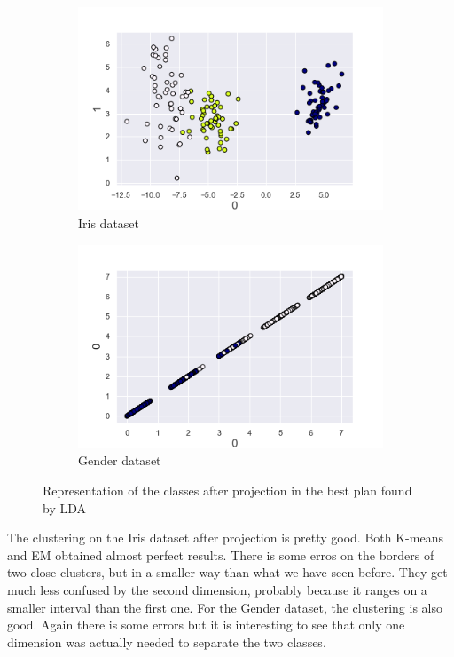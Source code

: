 \documentclass[twocolumn, 10pt]{article}
\begin{document}
			\begin{figure}[h]
				\centering
				\begin{subfigure}[t]{0.49\columnwidth}
					\centering
					\includegraphics[width=\linewidth]{../graphics/lda_iris_0_1_label.png}
					\caption{Iris dataset}
					\label{fig:lda_iris}
				\end{subfigure}
				\begin{subfigure}[t]{0.49\columnwidth}
					\centering
					\includegraphics[width=\linewidth]{../graphics/lda_g_0_0_label.png}
					\caption{Gender dataset}
					\label{fig:lda_g}
				\end{subfigure}
				\caption{Representation of the classes after projection in the best plan found by LDA}
			\label{fig:lda}
			\end{figure}

			The clustering on the Iris dataset after projection is pretty good. Both K-means and EM obtained almost perfect results. There is some erros on the borders of two close clusters, but in a smaller way than what we have seen before. They get much less confused by the second dimension, probably because it ranges on a smaller interval than the first one. For the Gender dataset, the clustering is also good. Again there is some errors but it is interesting to see that only one dimension was actually needed to separate the two classes.
\end{document}
